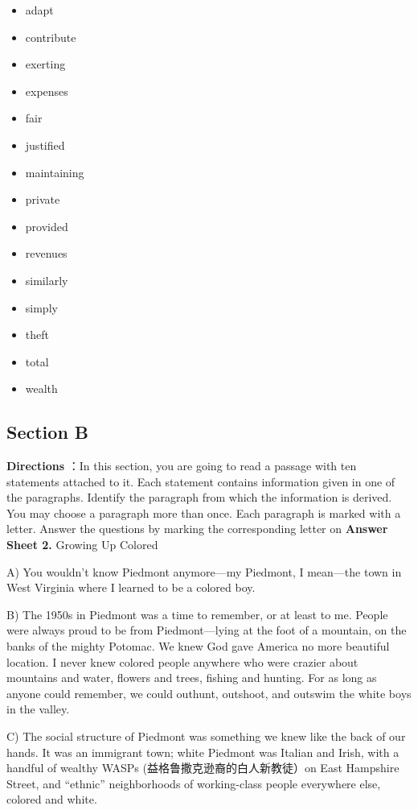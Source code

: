 \documentclass[UTF8,11pt]{ctexart}
\begin{document}
\begin{itemize}[leftmargin=2em,itemsep=.2em,topsep=.4em]\item[A.] adapt
\item[B.] contribute
\item[C.] exerting
\item[D.] expenses
\item[E.] fair
\item[F.] justified
\item[G.] maintaining
\item[H.] private
\item[I.] provided
\item[J.] revenues
\item[K.] similarly
\item[L.] simply
\item[M.] theft
\item[N.] total
\item[O.] wealth
\end{itemize}

\subsection*{\textbf{Section B}}


\textbf{Directions} ：In this section, you are going to read a passage with ten statements attached to it. Each statement contains information given in one of the paragraphs. Identify the paragraph from which the information is derived. You may choose a paragraph more than once. Each paragraph is marked with a letter. Answer the questions by marking the corresponding letter on\textbf{ Answer Sheet 2.} Growing Up Colored


A) You wouldn’t know Piedmont anymore—my Piedmont, I mean—the town in West Virginia where I learned to be a colored boy.


B) The 1950s in Piedmont was a time to remember, or at least to me. People were always proud to be from Piedmont—lying at the foot of a mountain, on the banks of the mighty Potomac. We knew God gave America no more beautiful location. I never knew colored people anywhere who were crazier about mountains and water, flowers and trees, fishing and hunting. For as long as anyone could remember, we could outhunt, outshoot, and outswim the white boys in the valley.


C) The social structure of Piedmont was something we knew like the back of our hands. It was an immigrant town; white Piedmont was Italian and Irish, with a handful of wealthy WASPs (益格鲁撒克逊裔的白人新教徒）on East Hampshire Street, and “ethnic” neighborhoods of working-class people everywhere else, colored and white.
\end{document}
